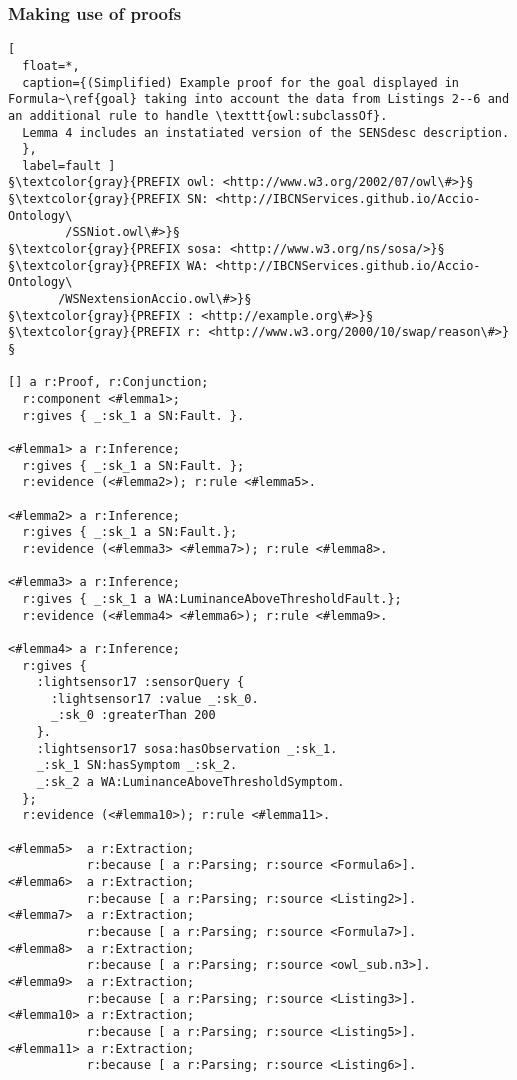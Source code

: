 \subsubsection{Making use of proofs}

\begin{lstlisting}[
  float=*,
  caption={(Simplified) Example proof for the goal displayed in Formula~\ref{goal} taking into account the data from Listings 2--6 and an additional rule to handle \texttt{owl:subclassOf}.
  Lemma 4 includes an instatiated version of the SENSdesc description.
  },
  label=fault ]
§\textcolor{gray}{PREFIX owl: <http://www.w3.org/2002/07/owl\#>}§
§\textcolor{gray}{PREFIX SN: <http://IBCNServices.github.io/Accio-Ontology\
        /SSNiot.owl\#>}§
§\textcolor{gray}{PREFIX sosa: <http://www.w3.org/ns/sosa/>}§
§\textcolor{gray}{PREFIX WA: <http://IBCNServices.github.io/Accio-Ontology\
       /WSNextensionAccio.owl\#>}§
§\textcolor{gray}{PREFIX : <http://example.org\#>}§
§\textcolor{gray}{PREFIX r: <http://www.w3.org/2000/10/swap/reason\#>}§

[] a r:Proof, r:Conjunction;
  r:component <#lemma1>;
  r:gives { _:sk_1 a SN:Fault. }.

<#lemma1> a r:Inference;
  r:gives { _:sk_1 a SN:Fault. };
  r:evidence (<#lemma2>); r:rule <#lemma5>.

<#lemma2> a r:Inference;
  r:gives { _:sk_1 a SN:Fault.};
  r:evidence (<#lemma3> <#lemma7>); r:rule <#lemma8>.

<#lemma3> a r:Inference;
  r:gives { _:sk_1 a WA:LuminanceAboveThresholdFault.};
  r:evidence (<#lemma4> <#lemma6>); r:rule <#lemma9>.
 
<#lemma4> a r:Inference;
  r:gives {
    :lightsensor17 :sensorQuery {
      :lightsensor17 :value _:sk_0.
      _:sk_0 :greaterThan 200
    }.
    :lightsensor17 sosa:hasObservation _:sk_1.
    _:sk_1 SN:hasSymptom _:sk_2.
    _:sk_2 a WA:LuminanceAboveThresholdSymptom.
  };
  r:evidence (<#lemma10>); r:rule <#lemma11>.

<#lemma5>  a r:Extraction; 
           r:because [ a r:Parsing; r:source <Formula6>].
<#lemma6>  a r:Extraction; 
           r:because [ a r:Parsing; r:source <Listing2>].
<#lemma7>  a r:Extraction; 
           r:because [ a r:Parsing; r:source <Formula7>].
<#lemma8>  a r:Extraction; 
           r:because [ a r:Parsing; r:source <owl_sub.n3>].
<#lemma9>  a r:Extraction; 
           r:because [ a r:Parsing; r:source <Listing3>].
<#lemma10> a r:Extraction; 
           r:because [ a r:Parsing; r:source <Listing5>].
<#lemma11> a r:Extraction; 
           r:because [ a r:Parsing; r:source <Listing6>].           
\end{lstlisting}
\normalsize

